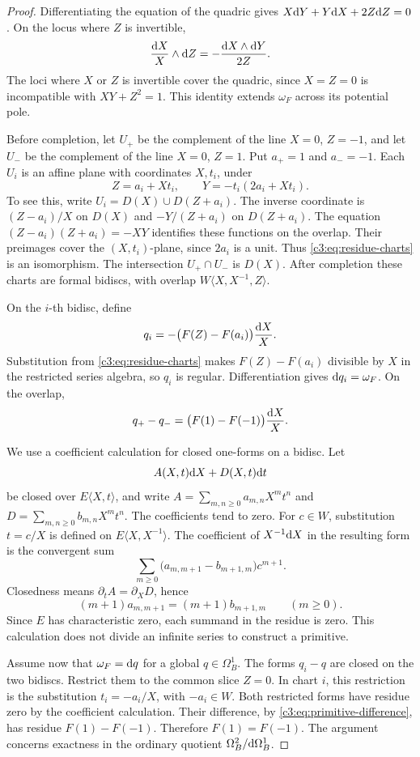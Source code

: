 \begin{proof}
Differentiating the equation of the quadric gives
$X\mathrm{d} Y+Y\mathrm{d} X+2Z\mathrm{d} Z=0$.
On the locus where $Z$ is invertible,
\[
 \frac{\mathrm{d} X}{X}\wedge\mathrm{d} Z
   =-\frac{\mathrm{d} X\wedge\mathrm{d} Y}{2Z}.
\]
The loci where $X$ or $Z$ is invertible cover the quadric, since
$X=Z=0$ is incompatible with $XY+Z^2=1$.
This identity extends $\omega_F$ across its potential pole.

Before completion, let $U_+$ be the complement of the line
$X=0$, $Z=-1$, and let $U_-$ be the complement of the line
$X=0$, $Z=1$.
Put $a_+=1$ and $a_-=-1$.
Each $U_i$ is an affine plane with coordinates $X,t_i$, under
\begin{equation}\label{c3:eq:residue-charts}
 Z=a_i+Xt_i,\qquad
 Y=-t_i(2a_i+Xt_i).
\end{equation}
To see this, write $U_i=D(X)\cup D(Z+a_i)$.
The inverse coordinate is
$(Z-a_i)/X$ on $D(X)$ and $-Y/(Z+a_i)$ on $D(Z+a_i)$.
The equation $(Z-a_i)(Z+a_i)=-XY$ identifies these functions on the
overlap.
Their preimages cover the $(X,t_i)$-plane, since $2a_i$ is a unit.
Thus \eqref{c3:eq:residue-charts} is an isomorphism.
The intersection $U_+\cap U_-$ is $D(X)$.
After completion these charts are formal bidiscs, with overlap
$W\langle X,X^{-1},Z\rangle$.

On the $i$-th bidisc, define
\[
 q_i=-\bigl(F(Z)-F(a_i)\bigr)\frac{\mathrm{d} X}{X}.
\]
Substitution from \eqref{c3:eq:residue-charts} makes
$F(Z)-F(a_i)$ divisible by $X$ in the restricted series algebra, so
$q_i$ is regular.
Differentiation gives $\mathrm{d} q_i=\omega_F$.
On the overlap,
\begin{equation}\label{c3:eq:primitive-difference}
 q_+-q_-=\bigl(F(1)-F(-1)\bigr)\frac{\mathrm{d} X}{X}.
\end{equation}

We use a coefficient calculation for closed one-forms on a bidisc.
Let
\[
 A(X,t)\mathrm{d} X+D(X,t)\mathrm{d} t
\]
be closed over $E\langle X,t\rangle$, and write
$A=\sum_{m,n\geq0}a_{m,n}X^mt^n$ and
$D=\sum_{m,n\geq0}b_{m,n}X^mt^n$.
The coefficients tend to zero.
For $c\in W$, substitution $t=c/X$ is defined on
$E\langle X,X^{-1}\rangle$.
The coefficient of $X^{-1}\mathrm{d} X$ in the resulting form is the
convergent sum
\[
 \sum_{m\geq0}
       \bigl(a_{m,m+1}-b_{m+1,m}\bigr)c^{m+1}.
\]
Closedness means $\partial_t A=\partial_X D$, hence
\[
 (m+1)a_{m,m+1}=(m+1)b_{m+1,m}
 \qquad(m\geq0).
\]
Since $E$ has characteristic zero, each summand in the residue is
zero. This calculation does not divide an infinite series to
construct a primitive.

Assume now that $\omega_F=\mathrm{d} q$ for a global
$q\in\Omega_B^1$.
The forms $q_i-q$ are closed on the two bidiscs.
Restrict them to the common slice $Z=0$.
In chart $i$, this restriction is the substitution
$t_i=-a_i/X$, with $-a_i\in W$.
Both restricted forms have residue zero by the coefficient
calculation.
Their difference, by \eqref{c3:eq:primitive-difference}, has residue
$F(1)-F(-1)$.
Therefore $F(1)=F(-1)$.
The argument concerns exactness in the ordinary quotient
$\Omega_B^2/\mathrm{d}\Omega_B^1$.
\end{proof}

